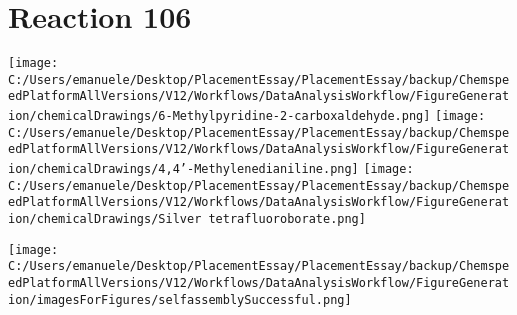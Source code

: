 \documentclass{article}%
\begin{document}
\section*{Reaction 106}%
%
\begin{scheme}[H]%
\begin{minipage}{0.5\textwidth}%
\texttt{[image: C:/Users/emanuele/Desktop/PlacementEssay/PlacementEssay/backup/ChemspeedPlatformAllVersions/V12/Workflows/DataAnalysisWorkflow/FigureGeneration/chemicalDrawings/6-Methylpyridine-2-carboxaldehyde.png]}%
\texttt{[image: C:/Users/emanuele/Desktop/PlacementEssay/PlacementEssay/backup/ChemspeedPlatformAllVersions/V12/Workflows/DataAnalysisWorkflow/FigureGeneration/chemicalDrawings/4,4'-Methylenedianiline.png]}%
\texttt{[image: C:/Users/emanuele/Desktop/PlacementEssay/PlacementEssay/backup/ChemspeedPlatformAllVersions/V12/Workflows/DataAnalysisWorkflow/FigureGeneration/chemicalDrawings/Silver tetrafluoroborate.png]}%
\end{minipage}%
\begin{minipage}{0.5\textwidth}%
\begin{center}%
\texttt{[image: C:/Users/emanuele/Desktop/PlacementEssay/PlacementEssay/backup/ChemspeedPlatformAllVersions/V12/Workflows/DataAnalysisWorkflow/FigureGeneration/imagesForFigures/selfassemblySuccessful.png]}%
\end{center}%
\end{minipage}%
\caption{Self-assembly of components 8, 17, with Silver(I) in a 3.0:1.5:1.0 molar ratio in CH$_3$CN at 60\textdegree C for 40h. These are the reagents (starting materials) for reaction 106.}%
\end{scheme}%
\end{document}
